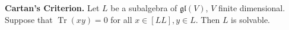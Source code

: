 \textbf{Cartan's Criterion.} Let $L$ be a subalgebra of $\mathfrak{gl}(V)$, $V$ finite dimensional. Suppose that $\operatorname{Tr}(xy) = 0$ for all $x \in [LL], y \in L$. Then $L$ is solvable.
